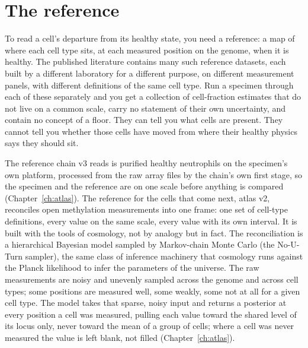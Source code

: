 \section{The reference}\label{sec:ag_reference}

To read a cell's departure from its healthy state, you need a reference: a map of where each cell type sits, at each measured position on
the genome, when it is healthy. The published literature contains many such reference datasets, each built by a different laboratory for
a different purpose, on different measurement panels, with different definitions of the same cell type. Run a specimen through each of
these separately and you get a collection of cell-fraction estimates that do not live on a common scale, carry no statement of their own
uncertainty, and contain no concept of a floor. They can tell you what cells are present. They cannot tell you whether those cells have
moved from where their healthy physics says they should sit. \interp

The reference chain v3 reads is purified healthy neutrophils on the specimen's own platform, processed from the raw array files by the
chain's own first stage, so the specimen and the reference are on one scale before anything is compared (Chapter~\ref{ch:atlas}).
\calibrated{} The reference for the cells that come next, atlas v2, reconciles open methylation measurements into one frame: one set of
cell-type definitions, every value on the same scale, every value with its own interval. It is built with the tools of cosmology, not by
analogy but in fact. The reconciliation is a hierarchical Bayesian model sampled by Markov-chain Monte Carlo (the No-U-Turn sampler), the
same class of inference machinery that cosmology runs against the Planck likelihood to infer the parameters of the universe. The raw
measurements are noisy and unevenly sampled across the genome and across cell types; some positions are measured well, some weakly, some
not at all for a given cell type. The model takes that sparse, noisy input and returns a posterior at every position a cell was measured,
pulling each value toward the shared level of its locus only, never toward the mean of a group of cells; where a cell was never measured
the value is left blank, not filled (Chapter~\ref{ch:atlas}). \calibrated

